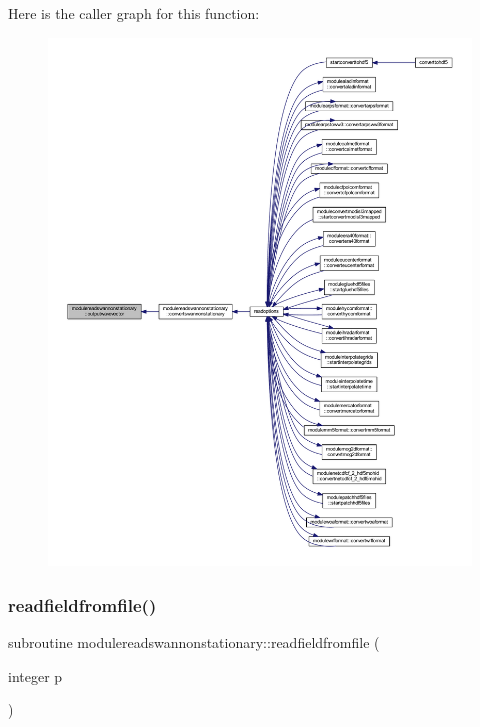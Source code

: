 Here is the caller graph for this function\+:\nopagebreak
\begin{figure}[H]
\begin{center}
\leavevmode
\includegraphics[width=350pt]{namespacemodulereadswannonstationary_a9381741247025c8f7b4fd4b06c7b9815_icgraph}
\end{center}
\end{figure}
\mbox{\label{namespacemodulereadswannonstationary_ab9855fa733bd4b591442908062b5e2cd}} 
\subsubsection{\texorpdfstring{readfieldfromfile()}{readfieldfromfile()}}
{\footnotesize\ttfamily subroutine modulereadswannonstationary\+::readfieldfromfile (\begin{DoxyParamCaption}\item[{integer}]{p }\end{DoxyParamCaption})\hspace{0.3cm}{\ttfamily [private]}}

